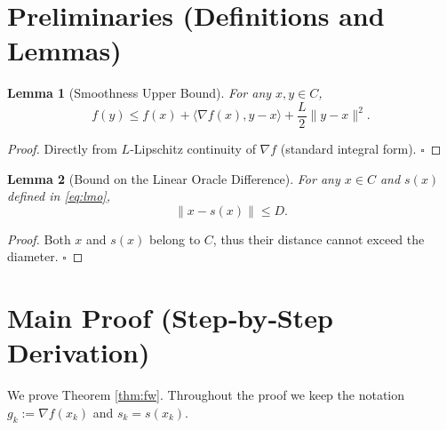 \documentclass{article}
\newtheorem{lemma}{Lemma}
\newcommand{\grad}{\nabla}
\newcommand{\inner}[2]{\langle #1,#2\rangle}
\begin{document}
\section*{Preliminaries (Definitions and Lemmas)}
\begin{lemma}[Smoothness Upper Bound]\label{lem:smooth}
For any $x,y\in C$,
\[
f(y)\le f(x)+\inner{\grad f(x)}{y-x}+ \frac{L}{2}\|y-x\|^{2}.
\tag{2}
\]
\end{lemma}
\begin{proof}
Directly from $L$‑Lipschitz continuity of $\grad f$ (standard integral form). \hfill $\square$
\end{proof}

\begin{lemma}[Bound on the Linear Oracle Difference]\label{lem:diam}
For any $x\in C$ and $s(x)$ defined in \eqref{eq:lmo},
\[
\|x-s(x)\|\le D .
\tag{3}
\]
\end{lemma}
\begin{proof}
Both $x$ and $s(x)$ belong to $C$, thus their distance cannot exceed the diameter. \hfill $\square$
\end{proof}

\section*{Main Proof (Step‑by‑Step Derivation)}
We prove Theorem \ref{thm:fw}. Throughout the proof we keep the notation $g_{k}:=\grad f(x_{k})$ and $s_{k}=s(x_{k})$.
\end{document}
